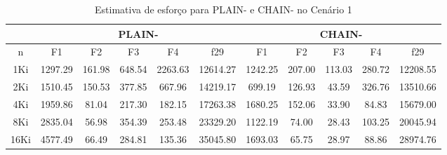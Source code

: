 \begin{table}[ht]
    \tiny
    \centering
    \caption{Estimativa de esforço para PLAIN- e CHAIN- no Cenário 1}\label{both-minus-effort}
    \begin{tabular}{c|ccccc|ccccc}
        \toprule
        & \multicolumn{5}{c}{PLAIN-} & \multicolumn{5}{c}{CHAIN-} \\
        \midrule
        n    &  F1       &  F2      &  F3      &  F4       &  f29       &  F1       &  F2      &  F3      &  F4      &  f29       \\\midrule
        1Ki  &  1297.29  &  161.98  &  648.54  &  2263.63  &  12614.27  &  1242.25  &  207.00  &  113.03  &  280.72  &  12208.55  \\\midrule
        2Ki  &  1510.45  &  150.53  &  377.85  &  667.96   &  14219.17  &  699.19   &  126.93  &  43.59   &  326.76  &  13510.66  \\\midrule
        4Ki  &  1959.86  &  81.04   &  217.30  &  182.15   &  17263.38  &  1680.25  &  152.06  &  33.90   &  84.83   &  15679.00  \\\midrule
        8Ki  &  2835.04  &  56.98   &  354.39  &  253.48   &  23329.20  &  1122.19  &  74.00   &  28.43   &  103.25  &  20045.94  \\\midrule
        16Ki &  4577.49  &  66.49   &  284.81  &  135.36   &  35045.80  &  1693.03  &  65.75   &  28.97   &  88.86   &  28974.76  \\
        \bottomrule
    \end{tabular}
\end{table}
